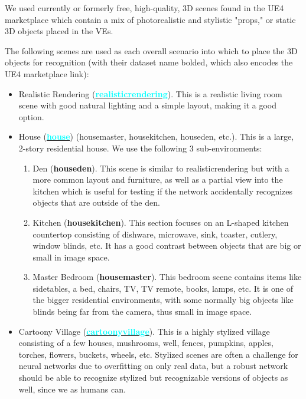 We used currently or formerly free, high-quality, 3D scenes found in the UE4 marketplace which contain a mix of photorealistic and stylistic "props," or static 3D objects placed in the VEs.

The following scenes are used as each overall scenario into which to place the 3D objects for recognition (with their dataset name bolded, which also encodes the UE4 marketplace link):
\begin{itemize}
    \item Realistic Rendering (\textbf{\href{https://unrealengine.com/learn/realistic-rendering}{\textcolor{cyan}{realisticrendering}}}). This is a realistic living room scene with good natural lighting and a simple layout, making it a good option.
    \item House (\textbf{\href{https://www.unrealengine.com/marketplace/en-US/product/hq-residential-house}{\textcolor{cyan}{house}}}) (housemaster, housekitchen, houseden, etc.). This is a large, 2-story residential house. We use the following 3 sub-environments:
    \begin{enumerate}
        \item Den (\textbf{houseden}). This scene is similar to realisticrendering but with a more common layout and furniture, as well as a partial view into the kitchen which is useful for testing if the network accidentally recognizes objects that are outside of the den.
        \item Kitchen (\textbf{housekitchen}). This section focuses on an L-shaped kitchen countertop consisting of dishware, microwave, sink, toaster, cutlery, window blinds, etc. It has a good contrast between objects that are big or small in image space. 
        \item Master Bedroom (\textbf{housemaster}). This bedroom scene contains items like sidetables, a bed, chairs, TV, TV remote, books, lamps, etc. It is one of the bigger residential environments, with some normally big objects like blinds being far from the camera, thus small in image space.
    \end{enumerate}
    \item Cartoony Village (\textbf{\href{https://www.unrealengine.com/marketplace/en-US/product/advanced-village-pack}{\textcolor{cyan}{cartoonyvillage}}}). This is a highly stylized village consisting of a few houses, mushrooms, well, fences, pumpkins, apples, torches, flowers, buckets, wheels, etc. Stylized scenes are often a challenge for neural networks due to overfitting on only real data, but a robust network should be able to recognize stylized but recognizable versions of objects as well, since we as humans can.

\end{itemize}
